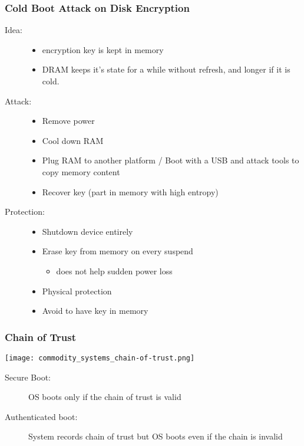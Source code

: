 \subsubsection{Cold Boot Attack on Disk Encryption}
\begin{description}
  \item[Idea:] \hfill
    \begin{itemize}
      \item encryption key is kept in memory
      \item DRAM keeps it's state for a while without refresh, and
	longer if it is cold.
    \end{itemize}
  \item[Attack:] \hfill
    \begin{itemize}
      \item Remove power
      \item Cool down RAM
      \item Plug RAM to another platform / Boot with a USB and attack
	tools to copy memory content
      \item Recover key (part in memory with high entropy)
    \end{itemize}
  \item[Protection:] \hfill
    \begin{itemize}
      \item Shutdown device entirely
      \item Erase key from memory on every suspend
	\begin{itemize}
	  \item does not help sudden power loss
	\end{itemize}
      \item Physical protection
      \item Avoid to have key in memory
    \end{itemize}
\end{description}


\subsubsection{Chain of Trust}
\begin{center}
  \texttt{[image: commodity\_systems\_chain-of-trust.png]}
\end{center}
\begin{description}
  \item[Secure Boot:] OS boots only if the chain of trust is valid
  \item[Authenticated boot:] System records chain of trust but OS boots
    even if the chain is invalid
\end{description}


